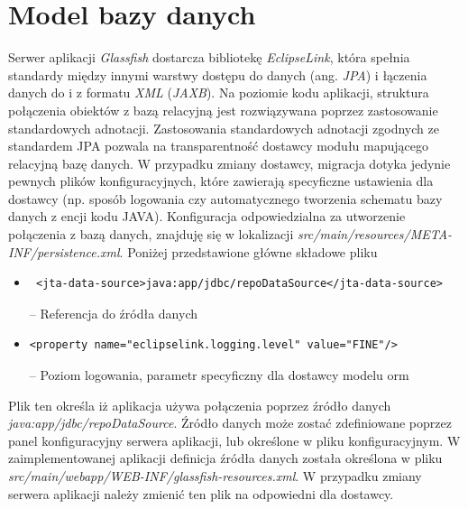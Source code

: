 \section{Model bazy danych}
Serwer aplikacji \textit{Glassfish} dostarcza bibliotekę \textit{EclipseLink}, która spełnia standardy między innymi warstwy dostępu do danych (ang. \textit{JPA}) i łączenia danych do i z formatu \textit{XML} (\textit{JAXB}). Na poziomie kodu aplikacji, struktura połączenia obiektów z bazą relacyjną jest rozwiązywana poprzez zastosowanie standardowych adnotacji. Zastosowania standardowych adnotacji zgodnych ze standardem JPA pozwala na transparentność dostawcy modułu mapującego relacyjną bazę danych. W przypadku zmiany dostawcy, migracja dotyka jedynie pewnych plików konfiguracyjnych, które zawierają specyficzne ustawienia dla dostawcy (np. sposób logowania czy automatycznego tworzenia schematu bazy danych z encji kodu JAVA).
Konfiguracja odpowiedzialna za utworzenie połączenia z bazą danych, znajduję się w lokalizacji \textit{src/main/resources/META-INF/persistence.xml}. Poniżej przedstawione główne składowe pliku

\begin{itemize}
	\item  {\footnotesize \begin{verbatim} <jta-data-source>java:app/jdbc/repoDataSource</jta-data-source> \end{verbatim}} -- Referencja do źródła danych
 	\item  {\footnotesize \begin{verbatim}<property name="eclipselink.logging.level" value="FINE"/>\end{verbatim}} -- Poziom logowania, parametr specyficzny dla dostawcy modelu orm
\end{itemize}


Plik ten określa iż aplikacja używa połączenia poprzez źródło danych \textit{java:app/jdbc/repoDataSource}. Źródło danych może zostać zdefiniowane poprzez panel konfiguracyjny serwera aplikacji, lub określone w pliku konfiguracyjnym. W zaimplementowanej aplikacji definicja źródła danych została określona w pliku \textit{src/main/webapp/WEB-INF/glassfish-resources.xml}. W przypadku zmiany serwera aplikacji należy zmienić ten plik na odpowiedni dla dostawcy.

